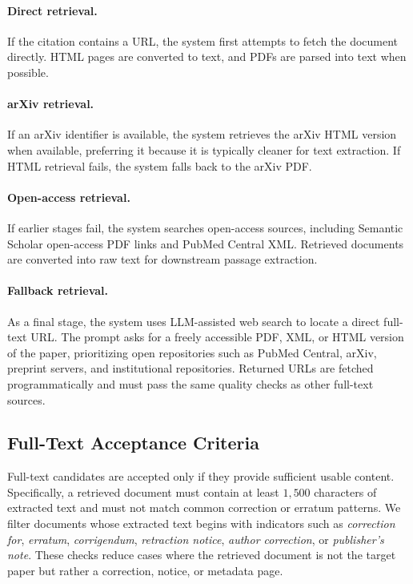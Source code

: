 \documentclass{article}
\theoremstyle{plain}
\theoremstyle{definition}
\theoremstyle{remark}
\begin{document}
\paragraph{Direct retrieval.}
If the citation contains a URL, the system first attempts to fetch the document directly. HTML pages are converted to text, and PDFs are parsed into text when possible.

\paragraph{arXiv retrieval.}
If an arXiv identifier is available, the system retrieves the arXiv HTML version when available, preferring it because it is typically cleaner for text extraction. If HTML retrieval fails, the system falls back to the arXiv PDF.

\paragraph{Open-access retrieval.}
If earlier stages fail, the system searches open-access sources, including Semantic Scholar open-access PDF links and PubMed Central XML. Retrieved documents are converted into raw text for downstream passage extraction.

\paragraph{Fallback retrieval.}
As a final stage, the system uses LLM-assisted web search to locate a direct full-text URL. The prompt asks for a freely accessible PDF, XML, or HTML version of the paper, prioritizing open repositories such as PubMed Central, arXiv, preprint servers, and institutional repositories. Returned URLs are fetched programmatically and must pass the same quality checks as other full-text sources.

\subsection{Full-Text Acceptance Criteria}
\label{app:fulltext_acceptance}

Full-text candidates are accepted only if they provide sufficient usable content. Specifically, a retrieved document must contain at least $1{,}500$ characters of extracted text and must not match common correction or erratum patterns. We filter documents whose extracted text begins with indicators such as \textit{correction for}, \textit{erratum}, \textit{corrigendum}, \textit{retraction notice}, \textit{author correction}, or \textit{publisher's note}. These checks reduce cases where the retrieved document is not the target paper but rather a correction, notice, or metadata page.
\end{document}
